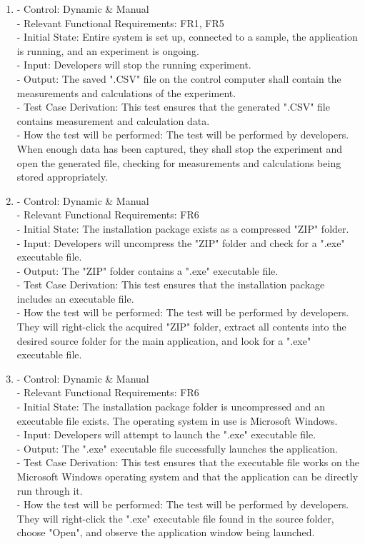 \documentclass[12pt, titlepage]{article}
\begin{document}
\begin{enumerate}[{FR-T}1.]
    \item\label{T12} - Control: Dynamic \& Manual\\ 
    - Relevant Functional Requirements: FR1, FR5\\
    - Initial State: Entire system is set up, connected to a sample, the application is running, and an experiment is ongoing.\\
    - Input: Developers will stop the running experiment.\\
    - Output: The saved ".CSV" file on the control computer shall contain the measurements and calculations of the experiment.\\
    - Test Case Derivation: This test ensures that the generated ".CSV" file contains measurement and calculation data.\\
    - How the test will be performed: The test will be performed by developers. When enough data has been captured, they shall stop the experiment and open the generated file, checking for measurements and calculations being stored appropriately.

    \item\label{T13} - Control: Dynamic \& Manual\\ 
    - Relevant Functional Requirements: FR6\\
    - Initial State: The installation package exists as a compressed "ZIP" folder.\\
    - Input: Developers will uncompress the "ZIP" folder and check for a ".exe" executable file.\\
    - Output: The "ZIP" folder contains a ".exe" executable file.\\
    - Test Case Derivation: This test ensures that the installation package includes an executable file.\\
    - How the test will be performed: The test will be performed by developers. They will right-click the acquired "ZIP" folder, extract all contents into the desired source folder for the main application, and look for a ".exe" executable file.

    \item\label{T13} - Control: Dynamic \& Manual\\ 
    - Relevant Functional Requirements: FR6\\
    - Initial State: The installation package folder is uncompressed and an executable file exists. The operating system in use is Microsoft Windows.\\
    - Input: Developers will attempt to launch the ".exe" executable file.\\
    - Output: The ".exe" executable file successfully launches the application.\\
    - Test Case Derivation: This test ensures that the executable file works on the Microsoft Windows operating system and that the application can be directly run through it.\\
    - How the test will be performed: The test will be performed by developers. They will right-click the ".exe" executable file found in the source folder, choose "Open", and observe the application window being launched.


\end{enumerate}
\end{document}
